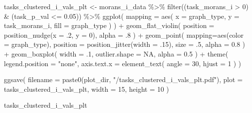 \documentclass[
]{book}
\newenvironment{Shaded}{\begin{snugshade}}{\end{snugshade}}
\newcommand{\AttributeTok}[1]{\textcolor[rgb]{0.77,0.63,0.00}{#1}}
\newcommand{\ConstantTok}[1]{\textcolor[rgb]{0.00,0.00,0.00}{#1}}
\newcommand{\DecValTok}[1]{\textcolor[rgb]{0.00,0.00,0.81}{#1}}
\newcommand{\FloatTok}[1]{\textcolor[rgb]{0.00,0.00,0.81}{#1}}
\newcommand{\FunctionTok}[1]{\textcolor[rgb]{0.00,0.00,0.00}{#1}}
\newcommand{\NormalTok}[1]{#1}
\newcommand{\OtherTok}[1]{\textcolor[rgb]{0.56,0.35,0.01}{#1}}
\newcommand{\SpecialCharTok}[1]{\textcolor[rgb]{0.00,0.00,0.00}{#1}}
\newcommand{\StringTok}[1]{\textcolor[rgb]{0.31,0.60,0.02}{#1}}
\begin{document}
\begin{Shaded}
\begin{Highlighting}[]
\NormalTok{tasks\_clustered\_i\_vals\_plt }\OtherTok{\textless{}{-}}\NormalTok{ morans\_i\_data }\SpecialCharTok{\%\textgreater{}\%}
  \FunctionTok{filter}\NormalTok{((task\_morans\_i }\SpecialCharTok{\textgreater{}} \DecValTok{0}\NormalTok{) }\SpecialCharTok{\&}\NormalTok{ (task\_p\_val }\SpecialCharTok{\textless{}=} \FloatTok{0.05}\NormalTok{)) }\SpecialCharTok{\%\textgreater{}\%}
  \FunctionTok{ggplot}\NormalTok{(}
    \AttributeTok{mapping =} \FunctionTok{aes}\NormalTok{(}
      \AttributeTok{x =}\NormalTok{ graph\_type,}
      \AttributeTok{y =}\NormalTok{ task\_morans\_i,}
      \AttributeTok{fill =}\NormalTok{ graph\_type}
\NormalTok{    )}
\NormalTok{  ) }\SpecialCharTok{+}
  \FunctionTok{geom\_flat\_violin}\NormalTok{(}
    \AttributeTok{position =} \FunctionTok{position\_nudge}\NormalTok{(}\AttributeTok{x =}\NormalTok{ .}\DecValTok{2}\NormalTok{, }\AttributeTok{y =} \DecValTok{0}\NormalTok{),}
    \AttributeTok{alpha =}\NormalTok{ .}\DecValTok{8}
\NormalTok{  ) }\SpecialCharTok{+}
  \FunctionTok{geom\_point}\NormalTok{(}
    \AttributeTok{mapping=}\FunctionTok{aes}\NormalTok{(}\AttributeTok{color =}\NormalTok{ graph\_type),}
    \AttributeTok{position =} \FunctionTok{position\_jitter}\NormalTok{(}\AttributeTok{width =}\NormalTok{ .}\DecValTok{15}\NormalTok{),}
    \AttributeTok{size =}\NormalTok{ .}\DecValTok{5}\NormalTok{,}
    \AttributeTok{alpha =} \FloatTok{0.8}
\NormalTok{  ) }\SpecialCharTok{+}
  \FunctionTok{geom\_boxplot}\NormalTok{(}
    \AttributeTok{width =}\NormalTok{ .}\DecValTok{1}\NormalTok{,}
    \AttributeTok{outlier.shape =} \ConstantTok{NA}\NormalTok{,}
    \AttributeTok{alpha =} \FloatTok{0.5}
\NormalTok{  ) }\SpecialCharTok{+}
  \FunctionTok{theme}\NormalTok{(}
    \AttributeTok{legend.position =} \StringTok{"none"}\NormalTok{,}
    \AttributeTok{axis.text.x =} \FunctionTok{element\_text}\NormalTok{(}
      \AttributeTok{angle =} \DecValTok{30}\NormalTok{,}
      \AttributeTok{hjust =} \DecValTok{1}
\NormalTok{    )}
\NormalTok{  )}

\FunctionTok{ggsave}\NormalTok{(}
  \AttributeTok{filename =} \FunctionTok{paste0}\NormalTok{(plot\_dir, }\StringTok{"/tasks\_clustered\_i\_vals\_plt.pdf"}\NormalTok{),}
  \AttributeTok{plot =}\NormalTok{ tasks\_clustered\_i\_vals\_plt,}
  \AttributeTok{width =} \DecValTok{15}\NormalTok{,}
  \AttributeTok{height =} \DecValTok{10}
\NormalTok{)}

\NormalTok{tasks\_clustered\_i\_vals\_plt}
\end{Highlighting}
\end{Shaded}
\end{document}
